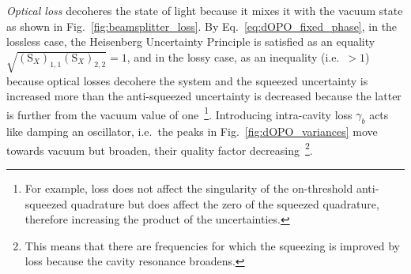 \emph{Optical loss} decoheres the state of light because it mixes it with the vacuum state as shown in Fig.~\ref{fig:beamsplitter_loss}.
By Eq.~\ref{eq:dOPO_fixed_phase}, in the lossless case, the Heisenberg Uncertainty Principle is satisfied as an equality $\sqrt{(\text{S}_X)_{1,1}(\text{S}_X)_{2,2}}=1$, and in the lossy case, as an inequality (i.e.\ $>1$) because optical losses decohere the system and the squeezed uncertainty is increased more than the anti-squeezed uncertainty is decreased because the latter is further from the vacuum value of one~\footnote{For example, loss does not affect the singularity of the on-threshold anti-squeezed quadrature but does affect the zero of the squeezed quadrature, therefore increasing the product of the uncertainties.}.
Introducing intra-cavity loss $\gamma_b$ acts like damping an oscillator, i.e.\ the peaks in Fig.~\ref{fig:dOPO_variances} move towards vacuum but broaden, their quality factor decreasing~\footnote{This means that there are frequencies for which the squeezing is improved by loss because the cavity resonance broadens.}.
